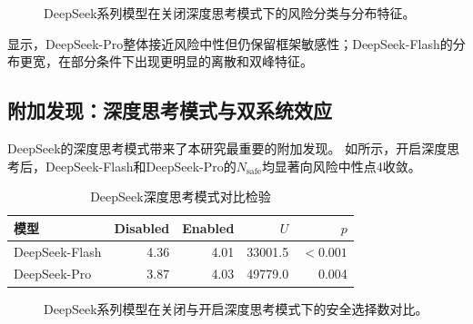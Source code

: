 \documentclass[journal]{vgtc}
\begin{document}
\begin{figure}[!htbp]
  \centering
  \begin{minipage}{0.98\linewidth}
    \centering
    
    \label{fig:deepseek_pro_risk_classification}
  \end{minipage}
  \vspace{0.3em}

  \begin{minipage}{0.98\linewidth}
    \centering
    
    \label{fig:deepseek_flash_distribution_disabled}
  \end{minipage}
  \caption{DeepSeek系列模型在关闭深度思考模式下的风险分类与分布特征。}
  \label{fig:deepseek_disabled_patterns}
\end{figure}

显示，DeepSeek-Pro整体接近风险中性但仍保留框架敏感性；DeepSeek-Flash的分布更宽，在部分条件下出现更明显的离散和双峰特征。

\subsection{附加发现：深度思考模式与双系统效应}

DeepSeek的深度思考模式带来了本研究最重要的附加发现。
如所示，开启深度思考后，DeepSeek-Flash和DeepSeek-Pro的$N_{\text{safe}}$均显著向风险中性点4收敛。

\begin{table}[tb]
  \caption{DeepSeek深度思考模式对比检验}
  \label{tab:thinking_effect}
  \centering
  \footnotesize
  \setlength{\tabcolsep}{4pt}
  \begin{tabular}{lrrrr}
    \toprule
    模型 & Disabled & Enabled & $U$ & $p$ \\
    \midrule
    DeepSeek-Flash & 4.36 & 4.01 & 33001.5 & $<0.001$ \\
    DeepSeek-Pro & 3.87 & 4.03 & 49779.0 & 0.004 \\
    \bottomrule
  \end{tabular}
\end{table}

\begin{figure}[!htbp]
  \centering
  
  \caption{DeepSeek系列模型在关闭与开启深度思考模式下的安全选择数对比。}
  \label{fig:deepseek_thinking}
\end{figure}
\end{document}
